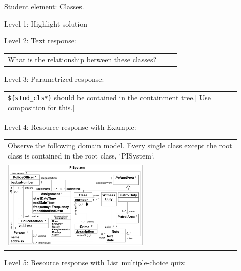 Student element: Classes.  \medskip

\noindent Level 1: Highlight solution  \medskip

\noindent Level 2: Text response: \medskip

\begin{tabular}{|p{0.9\linewidth}}
What is the relationship between these classes?
\end{tabular} \medskip

\noindent Level 3: Parametrized response: \medskip

\begin{tabular}{|p{0.9\linewidth}}
\verb|${stud_cls*}| should be contained in the containment tree.[ Use composition for this.]
\end{tabular} \medskip

\noindent Level 4: Resource response with Example: \medskip

\begin{tabular}{|p{0.9\linewidth}}
Observe the following domain model. Every single class except the root class is contained in the 
root class, `PISystem`.

\\
\includegraphics[width=0.6\textwidth]{images/PISystem.png}
\end{tabular} \medskip

\noindent Level 5: Resource response with List multiple-choice quiz: \medskip

